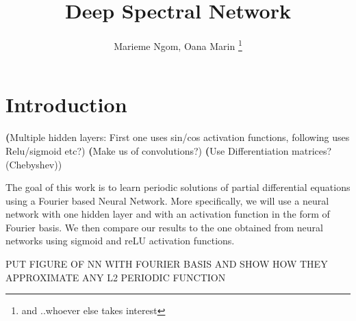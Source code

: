 \documentclass[11pt]{article}
\begin{document}

\title{Deep Spectral Network}
\author{Marieme Ngom, Oana Marin \footnote{and ..whoever else takes interest}}
\maketitle
\begin{abstract}

\end{abstract}




\linenumbers

\section{Introduction}
\textbf(Multiple hidden layers: First one uses sin/cos activation functions, following uses Relu/sigmoid etc?)
\textbf(Make us of convolutions?)
\textbf(Use Differentiation matrices?(Chebyshev))


The goal of this work is to learn periodic solutions of partial differential equations using a Fourier based Neural Network. More specifically, we will use a neural network with one hidden layer and with an activation function in the form of Fourier basis. We then compare our results to the one obtained from neural networks using sigmoid and reLU activation functions.

PUT FIGURE OF NN WITH FOURIER BASIS AND SHOW HOW THEY APPROXIMATE ANY L2 PERIODIC  FUNCTION






\end{document}
